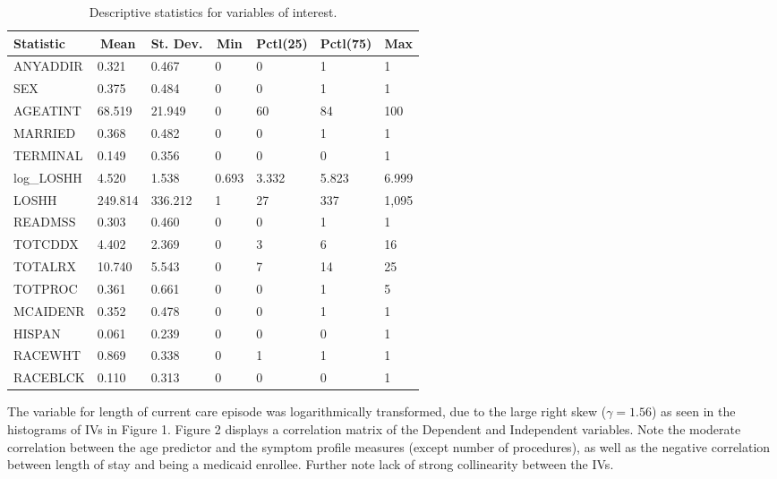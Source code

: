 \documentclass{article}
\begin{document}
\begin{table}[h]\centering 
\begin{tabular}{lllllll}
Statistic &
  \multicolumn{1}{c}{Mean} &
  \multicolumn{1}{c}{St. Dev.} &
  \multicolumn{1}{c}{Min} &
  \multicolumn{1}{c}{Pctl(25)} &
  \multicolumn{1}{c}{Pctl(75)} &
  \multicolumn{1}{c}{Max} \\ \hline
ANYADDIR   & 0.321   & 0.467   & 0     & 0     & 1     & 1     \\
SEX        & 0.375   & 0.484   & 0     & 0     & 1     & 1     \\
AGEATINT   & 68.519  & 21.949  & 0     & 60    & 84    & 100   \\
MARRIED    & 0.368   & 0.482   & 0     & 0     & 1     & 1     \\
TERMINAL   & 0.149   & 0.356   & 0     & 0     & 0     & 1     \\
log\_LOSHH & 4.520   & 1.538   & 0.693 & 3.332 & 5.823 & 6.999 \\
LOSHH      & 249.814 & 336.212 & 1     & 27    & 337   & 1,095 \\
READMSS    & 0.303   & 0.460   & 0     & 0     & 1     & 1     \\
TOTCDDX    & 4.402   & 2.369   & 0     & 3     & 6     & 16    \\
TOTALRX    & 10.740  & 5.543   & 0     & 7     & 14    & 25    \\
TOTPROC    & 0.361   & 0.661   & 0     & 0     & 1     & 5     \\
MCAIDENR   & 0.352   & 0.478   & 0     & 0     & 1     & 1     \\
HISPAN     & 0.061   & 0.239   & 0     & 0     & 0     & 1     \\
RACEWHT    & 0.869   & 0.338   & 0     & 1     & 1     & 1     \\
RACEBLCK   & 0.110   & 0.313   & 0     & 0     & 0     & 1    
\end{tabular}
\caption{Descriptive statistics for variables of interest.}
\end{table}

The variable for length of current care episode was logarithmically transformed, due to the large right skew ($\gamma = 1.56$) as seen in the histograms of IVs in Figure 1. Figure 2 displays a correlation matrix of the Dependent and Independent variables. Note the moderate correlation between the age predictor and the symptom profile measures (except number of procedures), as well as the negative correlation between length of stay and being a medicaid enrollee. Further note lack of strong collinearity between the IVs. 
\end{document}
